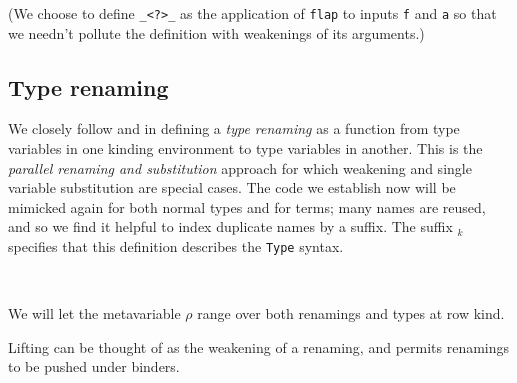 \documentclass[authoryear, acmsmall, screen, review, nonacm]{acmart}
\begin{document}
\Ni (We choose to define \verb!_<?>_! as the application of \verb!flap! to inputs \verb!f! and \verb!a! so that we needn't pollute the definition with weakenings of its arguments.)





\subsection{Type renaming}

We closely follow \citet{plfa22} and \citet{ChapmanKNW19}  in defining a \emph{type renaming} as a function from type variables in one kinding environment to type variables in another. This is the \emph{parallel renaming and substitution} approach for which weakening and single variable substitution are special cases. The code we establish now will be mimicked again for both normal types and for terms; many names are reused, and so we find it helpful to index duplicate names by a suffix. The suffix $_k$ specifies that this definition describes the \verb!Type! syntax.

\begin{code}%
\>[0]\AgdaSpace{}%
\AgdaSymbol{:}\AgdaSpace{}%
\AgdaSpace{}%
\AgdaSpace{}%
\AgdaSpace{}%
\AgdaSpace{}%
\<%
\\
\>[0]\AgdaSpace{}%
\AgdaSpace{}%
\AgdaSpace{}%
\AgdaSymbol{=}\AgdaSpace{}%
\AgdaSpace{}%
\AgdaSymbol{\{}\AgdaSymbol{\}}\AgdaSpace{}%
\AgdaSpace{}%
\AgdaSpace{}%
\AgdaSpace{}%
\AgdaSpace{}%
\AgdaSpace{}%
\AgdaSpace{}%
\AgdaSpace{}%
\<%
\end{code}

\Ni We will let the metavariable $\rho$ range over both renamings and types at row kind.

Lifting can be thought of as the weakening of a renaming, and permits renamings to be pushed under binders.
\end{document}
